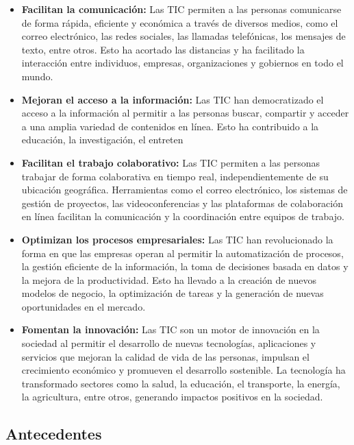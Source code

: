 \documentclass{article}
\begin{document}
    \begin{itemize}
      \item \textbf{Facilitan la comunicación:} Las TIC permiten a las personas comunicarse de forma rápida, eficiente y económica a través de diversos medios, como el correo electrónico, las redes sociales, las llamadas telefónicas, los mensajes de texto, entre otros. Esto ha acortado las distancias y ha facilitado la interacción entre individuos, empresas, organizaciones y gobiernos en todo el mundo.

      \item \textbf{Mejoran el acceso a la información:} Las TIC han democratizado el acceso a la información al permitir a las personas buscar, compartir y acceder a una amplia variedad de contenidos en línea. Esto ha contribuido a la educación, la investigación, el entreten
      \item \textbf{Facilitan el trabajo colaborativo:} Las TIC permiten a las personas trabajar de forma colaborativa en tiempo real, independientemente de su ubicación geográfica. Herramientas como el correo electrónico, los sistemas de gestión de proyectos, las videoconferencias y las plataformas de colaboración en línea facilitan la comunicación y la coordinación entre equipos de trabajo.
      
      \item \textbf{Optimizan los procesos empresariales:} Las TIC han revolucionado la forma en que las empresas operan al permitir la automatización de procesos, la gestión eficiente de la información, la toma de decisiones basada en datos y la mejora de la productividad. Esto ha llevado a la creación de nuevos modelos de negocio, la optimización de tareas y la generación de nuevas oportunidades en el mercado.
      
      \item \textbf{Fomentan la innovación:} Las TIC son un motor de innovación en la sociedad al permitir el desarrollo de nuevas tecnologías, aplicaciones y servicios que mejoran la calidad de vida de las personas, impulsan el crecimiento económico y promueven el desarrollo sostenible. La tecnología ha transformado sectores como la salud, la educación, el transporte, la energía, la agricultura, entre otros, generando impactos positivos en la sociedad.
    \end{itemize}

\newpage 

\subsection{Antecedentes}
\end{document}
